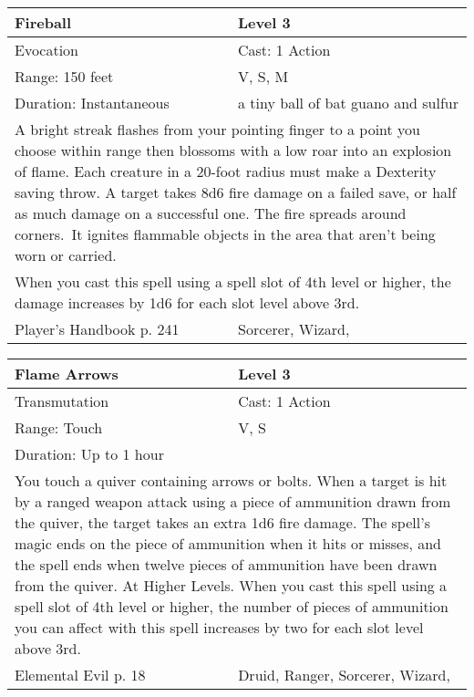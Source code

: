 \documentclass[11pt]{report}
\begin{document}
\begin{table}[H]
	\begin{tabular}{||p{6cm}|p{6cm}||}
		\hline\hline
		\bf{Fireball} & Level 3\\ \hline
		Evocation & Cast: 1 Action\\ \hline
		Range: 150 feet & V, S, M\\ \hline
		Duration: Instantaneous & a tiny ball of bat guano and sulfur\\ \hline
		\multicolumn{2}{||p{12cm}||}{A bright streak flashes from your pointing finger to a point you choose within range then blossoms with a low roar into an explosion of flame.
Each creature in a 20-foot radius must make a Dexterity saving throw. A target takes 8d6 fire damage on a failed save, or half as much damage on a successful one. The fire spreads around corners. It ignites flammable objects in the area that aren’t being worn or carried.}\\ \hline
		\multicolumn{2}{||p{12cm}||}{When you cast this spell using a spell slot of 4th level or higher, the damage increases by 1d6 for each slot level above 3rd.}\\ \hline
Player's Handbook p. 241 & Sorcerer, Wizard, \\ \hline\hline
	\end{tabular}
\end{table}

\begin{table}[H]
	\begin{tabular}{||p{6cm}|p{6cm}||}
		\hline\hline
		\bf{Flame Arrows} & Level 3\\ \hline
		Transmutation & Cast: 1 Action\\ \hline
		Range: Touch & V, S\\ \hline
		Duration: Up to 1 hour & \\ \hline
		\multicolumn{2}{||p{12cm}||}{You touch a quiver containing arrows or bolts. When a target is hit by a ranged weapon attack using a piece of ammunition drawn from the quiver, the target takes an extra 1d6 fire damage. The spell’s magic ends on the piece of ammunition when it hits or misses, and the spell ends when twelve pieces of ammunition have been drawn from the quiver.
At Higher Levels. When you cast this spell using a spell slot of 4th level or higher, the number of pieces of ammunition you can affect with this spell increases by two for each slot level above 3rd.}\\ \hline
Elemental Evil p. 18 & Druid, Ranger, Sorcerer, Wizard, \\ \hline\hline
	\end{tabular}
\end{table}
\end{document}
